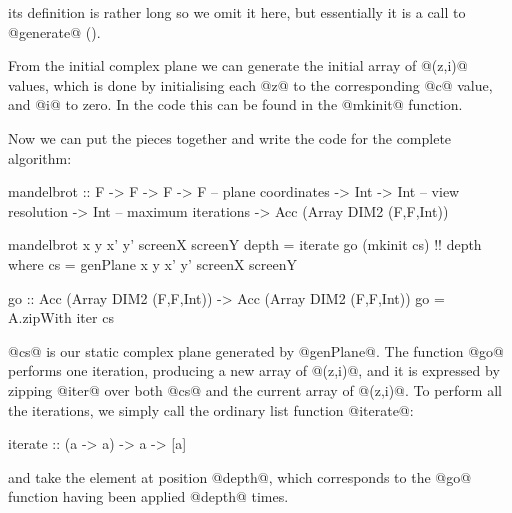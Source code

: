 \noindent its definition is rather long so we omit it here, but
essentially it is a call to @generate@
().

From the initial complex plane we can generate the initial array of
@(z,i)@ values, which is done by initialising each @z@ to the
corresponding @c@ value, and @i@ to zero.  In the code this can be
found in the @mkinit@ function.

Now we can put the pieces together and write the code for the complete
algorithm:

\begin{haskell}
mandelbrot :: F -> F -> F -> F -- plane coordinates
           -> Int -> Int       -- view resolution
           -> Int              -- maximum iterations
           -> Acc (Array DIM2 (F,F,Int))

mandelbrot x y x' y' screenX screenY depth
  = iterate go (mkinit cs) !! depth
  where
    cs  = genPlane x y x' y' screenX screenY

    go :: Acc (Array DIM2 (F,F,Int))
       -> Acc (Array DIM2 (F,F,Int))
    go = A.zipWith iter cs
\end{haskell}

\noindent @cs@ is our static complex plane generated by @genPlane@.
The function @go@ performs one iteration, producing a new array of
@(z,i)@, and it is expressed by zipping @iter@ over both @cs@ and the
current array of @(z,i)@.  To perform all the iterations, we simply
call the ordinary list function @iterate@:

\begin{haskell}
iterate :: (a -> a) -> a -> [a]
\end{haskell}

\noindent and take the element at position @depth@, which corresponds
to the @go@ function having been applied @depth@ times.
